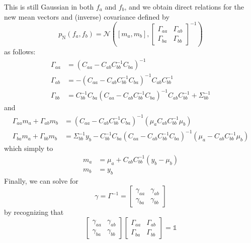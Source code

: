 \documentclass[onecolumn]{article}
\begin{document}
This is still Gaussian in both $f_a$ and $f_b$, and we obtain direct relations for the new mean vectors and (inverse) covariance defined by
\begin{equation}
    p_\mathrm{N}(f_a, f_b) = \mathcal{N}\left([m_a, m_b], \begin{bmatrix} \Gamma_{aa} & \Gamma_{ab} \\ \Gamma_{ba} & \Gamma_{bb} \end{bmatrix}^{-1} \right)
\end{equation}
as follows:
\begin{align}
    \Gamma_{aa} & = \left(C_{aa} - C_{ab} C_{bb}^{-1} C_{ba}\right)^{-1} \\
    \Gamma_{ab} & = - \left(C_{aa} - C_{ab} C_{bb}^{-1} C_{ba}\right)^{-1} C_{ab} C_{bb}^{-1} \\
    \Gamma_{bb} & = C_{bb}^{-1} C_{ba} \left(C_{aa} - C_{ab} C_{bb}^{-1} C_{ba}\right)^{-1} C_{ab} C_{bb}^{-1} + \Sigma_{bb}^{-1}
\end{align}
and
\begin{align}
    \Gamma_{aa} m_a + \Gamma_{ab} m_b & = \left(C_{aa} - C_{ab} C_{bb}^{-1} C_{ba}\right)^{-1} \left(\mu_a C_{ab} C_{bb}^{-1} \mu_b \right) \\
    \Gamma_{ba} m_a + \Gamma_{bb} m_b & = \Sigma_{bb}^{-1} y_b - C_{bb}^{-1} C_{ba} \left(C_{aa} - C_{ab} C_{bb}^{-1} C_{ba}\right)^{-1} \left(\mu_a - C_{ab} C_{bb}^{-1} \mu_b \right)
\end{align}
which simply to
\begin{align}
    m_a & = \mu_a + C_{ab} C_{bb}^{-1} \left( y_b - \mu_b \right) \\
    m_b & = y_b
\end{align}
Finally, we can solve for
\begin{equation}
    \gamma = \Gamma^{-1} = \begin{bmatrix} \gamma_{aa} & \gamma_{ab} \\ \gamma_{ba} & \gamma_{bb} \end{bmatrix}
\end{equation}
by recognizing that
\begin{equation}
    \begin{bmatrix} \gamma_{aa} & \gamma_{ab} \\ \gamma_{ba} & \gamma_{bb} \end{bmatrix} \begin{bmatrix} \Gamma_{aa} & \Gamma_{ab} \\ \Gamma_{ba} & \Gamma_{bb} \end{bmatrix} = \mathbb{1}
\end{equation}
\end{document}
